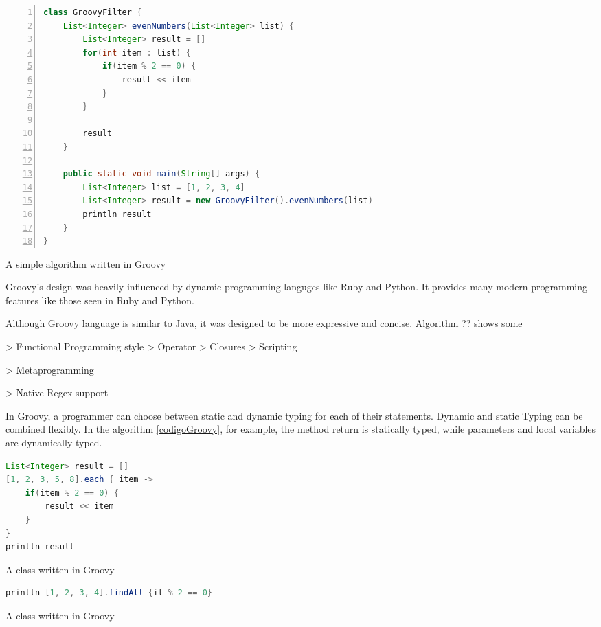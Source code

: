 \documentclass[preprint]{sigplanconf}
\begin{document}
\begin{Listing}[ht]
\begin{lstlisting}[language=Java,tabsize=2,breaklines=true,numbers=left]
class GroovyFilter {
	List<Integer> evenNumbers(List<Integer> list) {
		List<Integer> result = []
		for(int item : list) {
			if(item % 2 == 0) {
				result << item
			}
		}

		result
	}

	public static void main(String[] args) {
		List<Integer> list = [1, 2, 3, 4]
		List<Integer> result = new GroovyFilter().evenNumbers(list)
		println result
	}
}
\end{lstlisting}
\caption{A simple algorithm written in Groovy}
\label{groovyClass}
\end{Listing}

Groovy's design was heavily influenced by dynamic programming languges like Ruby and Python.
It provides many modern programming features like those seen in Ruby and Python.


Although Groovy language is similar to Java, it was designed to be more expressive and concise. Algorithm ?? shows some 



> Functional Programming style 
> Operator
> Closures 
> Scripting 

> Metaprogramming 

> Native Regex support 


In Groovy, a programmer can choose between static and dynamic typing for each of their statements. Dynamic and static Typing can be combined flexibly. In the algorithm \ref{codigoGroovy}, for example, the method return is statically typed, while parameters and local variables are dynamically typed.




\begin{Listing}[ht]
\begin{lstlisting}[language=Java,tabsize=2,breaklines=true]
List<Integer> result = []
[1, 2, 3, 5, 8].each { item ->
	if(item % 2 == 0) {
		result << item
	}
}
println result
\end{lstlisting}
\caption{A class written in Groovy}
\label{codigoGroovy}
\end{Listing}

\begin{Listing}[ht]
\begin{lstlisting}[language=Java,tabsize=2,breaklines=true]
println [1, 2, 3, 4].findAll {it % 2 == 0}
\end{lstlisting}
\caption{A class written in Groovy}
\label{codigoGroovy}
\end{Listing}
\end{document}
